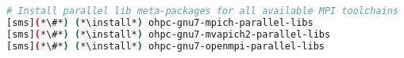 
\begin{lstlisting}[language=bash,keywords={},upquote=true,keepspaces]
# Install parallel lib meta-packages for all available MPI toolchains
[sms](*\#*) (*\install*) ohpc-gnu7-mpich-parallel-libs
[sms](*\#*) (*\install*) ohpc-gnu7-mvapich2-parallel-libs
[sms](*\#*) (*\install*) ohpc-gnu7-openmpi-parallel-libs
\end{lstlisting}
